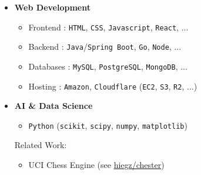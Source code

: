 \documentclass[]{article}
\begin{document}
\vspace{5pt}
\begin{minipage}[t]{0.49\linewidth}
    \begin{itemize}[leftmargin=0.15in, rightmargin=0.15in, label={}]
        \item {\large\bfseries Web Development}

            \begin{itemize}
                \item Frontend : \verb|HTML|, \verb|CSS|, \verb|Javascript|, \verb|React|, ...
                \item Backend : \verb|Java|/\verb|Spring Boot|, \verb|Go|, \verb|Node|, ...
                \item Databases : \verb|MySQL|, \verb|PostgreSQL|, \verb|MongoDB|, ...
                \item Hosting : \verb|Amazon|, \verb|Cloudflare| (\verb|EC2|, \verb|S3|, \verb|R2|, ...)
            \end{itemize}
    \end{itemize}
\end{minipage}
\hspace{10pt}
\begin{minipage}[t]{0.49\linewidth}
    \begin{itemize}[leftmargin=0.15in, rightmargin=0.15in, label={}]
        \item {\large\bfseries AI \& Data Science}
            \begin{itemize}
                \item \verb|Python| (\verb|scikit|, \verb|scipy|, \verb|numpy|, \verb|matplotlib|)
            \end{itemize}
            Related Work:
            \begin{itemize}
                \item UCI Chess Engine (see \href{https://github.com/hiegz/chester}{\ttfamily hiegz/chester}) \\[3pt]
            \end{itemize}
    \end{itemize}
\end{minipage}
\\[20pt]
\end{document}
